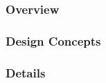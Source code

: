 \subsubsection{Overview}
\label{subsub:method:model:overview}


\subsubsection{Design Concepts}
\label{subsub:method:model:design}


\subsubsection{Details}
\label{subsub:method:model:details}
